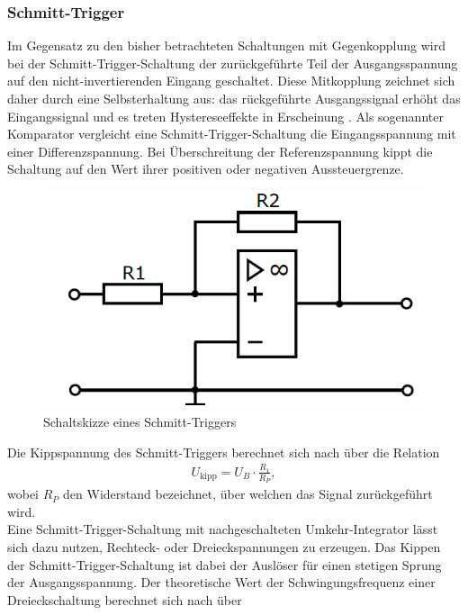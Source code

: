 \subsubsection{Schmitt-Trigger}
\noindent Im Gegensatz zu den bisher betrachteten Schaltungen mit Gegenkopplung
wird bei der Schmitt-Trigger-Schaltung der zurückgeführte Teil der
Ausgangsspannung auf den nicht-invertierenden Eingang geschaltet. Diese Mitkopplung
zeichnet sich daher durch eine Selbsterhaltung aus: das rückgeführte
Ausgangssignal erhöht das Eingangssignal und es treten Hystereseeffekte in
Erscheinung \cite{elektrotechnik}. Als sogenannter Komparator vergleicht eine
Schmitt-Trigger-Schaltung die Eingangsspannung mit einer Differenzspannung.
Bei Überschreitung der Referenzspannung kippt die Schaltung auf den Wert ihrer
positiven oder negativen Aussteuergrenze.
\FloatBarrier
\begin{figure}
  \centering
  \includegraphics[scale=0.99]{ressources/figure_06.png}
  \caption{Schaltskizze eines Schmitt-Triggers \cite{sample}}
  \label{fig:06}
\end{figure}
\FloatBarrier
\noindent Die Kippspannung des Schmitt-Triggers berechnet sich nach \cite{federau}
über die Relation
\begin{align}
  U_\text{kipp} = U_B \cdot \frac{R_1}{R_P},
  \label{eqn:09}
\end{align}
wobei $R_P$ den Widerstand bezeichnet, über welchen das Signal zurückgeführt
wird. \\
\noindent Eine Schmitt-Trigger-Schaltung mit nachgeschalteten Umkehr-Integrator
lässt sich dazu nutzen, Rechteck- oder Dreieckspannungen zu erzeugen.
Das Kippen der Schmitt-Trigger-Schaltung ist dabei der Auslöser für einen
stetigen Sprung der Ausgangsspannung. Der theoretische Wert der Schwingungsfrequenz
einer Dreieckschaltung berechnet sich nach \cite{sample} über
